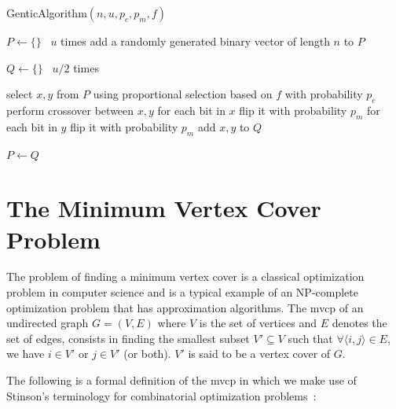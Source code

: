 \documentclass[12pt]{article}
\begin{document}
\begin{algorithm}[!htb]
\caption{GenticAlgorithm$\left( n, u, p_c, p_m, f \right)$}
\label{alg:ga}

\begin{algorithmic}[1]


\State $ P \gets \{ \} $
\Loop \ $u$ times
\State add a randomly generated binary vector of length $n$ to $P$
\EndLoop

\State $Q \gets \{ \}$
\Loop \ $u/2$ times

\State select $x, y$ from $P$ using proportional selection based on $f$
\State with probability $p_c$ perform crossover between $x, y$
\label{alg:crossover}
\State for each bit in $x$ flip it with probability $p_m$
\label{alg:m1}
\State for each bit in $y$ flip it with probability $p_m$
\label{alg:m2}
\State add $x, y$ to $Q$

\EndLoop

\State $P \gets Q$
\EndWhile


\end{algorithmic}

\end{algorithm}



\section{The Minimum Vertex Cover Problem}
\label{sec:mvcp}
The problem of finding a minimum vertex cover is a classical
optimization problem in computer science and is a typical
example of an NP-complete optimization problem \cite{wolfram:mvc}
that has approximation algorithms.
The mvcp of an undirected graph $G = (V, E)$ where $V$ is
the set of vertices and $E$ denotes the set of edges,
consists in finding the smallest subset $V' \subseteq V$ such that
$\forall \langle i, j \rangle \in E$, we have $i \in V'$ or $j \in V'$ (or both).
$V'$ is said to be a vertex cover of $G$.

The following is a formal definition of
the mvcp in which we make use of Stinson's terminology
for combinatorial optimization problems~\cite{14:mvcp}:
\end{document}
